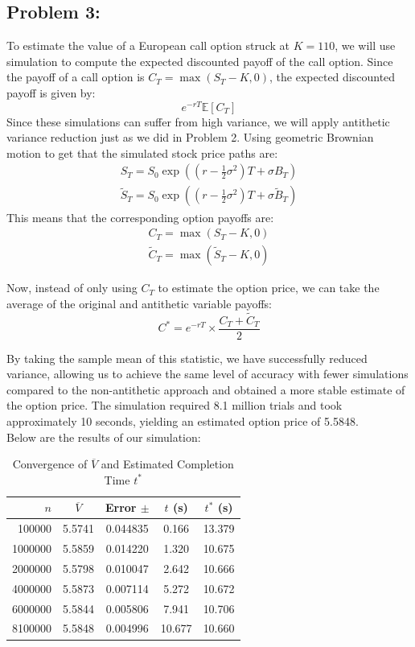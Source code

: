 \documentclass{report}
\begin{document}
\newpage
\subsection*{Problem 3:}
To estimate the value of a European call option struck at $K = 110$, we will use simulation to compute the expected discounted payoff of the call option. Since the payoff of a call option is $C_T=\max(S_T-K, 0)$, the expected discounted payoff is given by:
\[
e^{-rT}\mathbb{E}[C_T]
\]
Since these simulations can suffer from high variance, we will apply antithetic variance reduction just as we did in Problem 2. Using geometric Brownian motion to get that the simulated stock price paths are:
\begin{align*}
S_T=S_0\exp((r-\frac{1}{2}\sigma^2)T + \sigma B_T) \\
\widetilde{S}_T=S_0\exp((r-\frac{1}{2}\sigma^2)T + \sigma \widetilde{B}_T)
\end{align*}
This means that the corresponding option payoffs are:
\begin{align*}
C_T=\max(S_T - K, 0) \\
\widetilde{C}_T=\max(\widetilde{S}_T - K, 0)
\end{align*}

Now, instead of only using $C_T$ to estimate the option price, we can take the average of the original and antithetic variable payoffs:
\[
C^*=e^{-rT} \times \frac{C_T + \widetilde{C}_T}{2}
\]

By taking the sample mean of this statistic, we have successfully reduced variance, allowing us to achieve the same level of accuracy with fewer simulations compared to the non-antithetic approach and obtained a more stable estimate of the option price. The simulation required 8.1 million trials and took approximately 10 seconds, yielding an estimated option price of 5.5848. \\

Below are the results of our simulation:

\begin{table}[H]
    \centering
    \caption{Convergence of $\overline{V}$ and Estimated Completion Time $t^*$}
    \label{tab:simulation_results}
    \begin{tabular}{rcccc}
        \hline
        $n$ & $\overline{V}$ & Error $\pm$ & $t$ (s) & $t^*$ (s) \\
        \hline
        100000  & 5.5741 & 0.044835 & 0.166  & 13.379 \\ 
        1000000 & 5.5859 & 0.014220 & 1.320  & 10.675 \\
        2000000 & 5.5798 & 0.010047 & 2.642  & 10.666 \\
        4000000 & 5.5873 & 0.007114 & 5.272  & 10.672 \\
        6000000 & 5.5844 & 0.005806 & 7.941  & 10.706 \\
        8100000 & 5.5848 & 0.004996 & 10.677 & 10.660 \\
        \hline
    \end{tabular}
\end{table}
\end{document}
